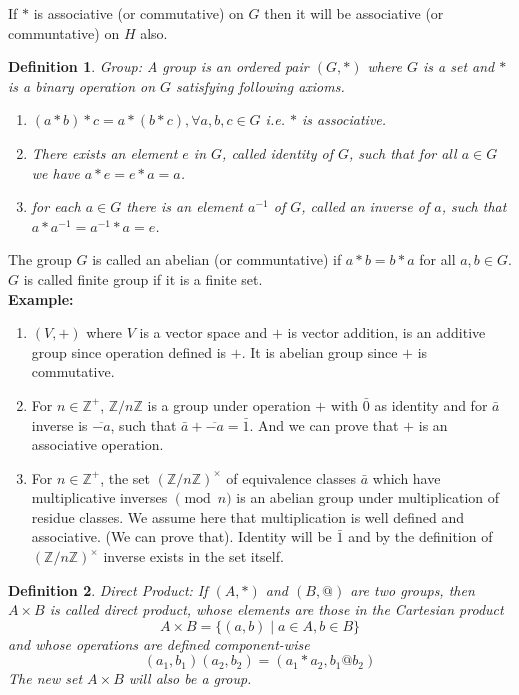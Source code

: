\documentclass[12pt]{report}
\newtheorem{defn}{Definition}
\begin{document}
If $*$ is associative (or commutative) on $G$ then it will be associative (or communtative) on $H$ also.
\begin{defn}
    Group: A group is an ordered pair $(G, *)$ where $G$ is a set and $*$ is a binary operation on $G$ satisfying following axioms.
    \begin{enumerate}
        \item $(a*b)*c = a*(b*c), \forall a,b,c \in G$ i.e. $*$ is associative.
        \item There exists an element $e$ in $G$, called identity of $G$, such that for all $a \in G$ we have $a*e = e*a = a$.
        \item for each $a \in G$ there is an element $a^{-1}$ of $G$, called an inverse of $a$, such that $a * a^{-1} = a^{-1} * a = e$.
    \end{enumerate}
\end{defn}
The group $G$ is called an abelian (or communtative) if $a*b = b*a$ for all $a,b \in G$.
$G$ is called finite group if it is a finite set.\\
\textbf{Example: }
\begin{enumerate}
    \item $(V, +)$ where $V$ is a vector space and $+$ is vector addition, is an additive group since operation defined is $+$. It is abelian group since $+$ is commutative.
    \item For $n \in \mathbb{Z}^+$, $\mathbb{Z}/n\mathbb{Z}$ is a group under operation $+$ with $\bar{0}$ as identity and for $\bar{a}$ inverse is $\overline{-a}$, such that $\bar{a} + \overline{-a} = \bar{1}$. And we can prove that $+$ is an associative operation.
    \item For $n \in \mathbb{Z}^+$, the set $(\mathbb{Z}/n\mathbb{Z})^{\times}$ of equivalence classes $\bar{a}$ which have multiplicative inverses $\pmod n$ is an abelian group under multiplication of residue classes. We assume here that multiplication is well defined and associative. (We can prove that). Identity will be $\bar{1}$ and by the definition of $(\mathbb{Z}/n\mathbb{Z})^{\times}$ inverse exists in the set itself.
\end{enumerate}
\begin{defn}
    Direct Product: If $(A, *)$ and $(B, @)$ are two groups, then $A \times B$ is called direct product, whose elements are those in the Cartesian product
    $$ A \times B = \{(a,b) \mid a \in A, b \in B\}$$
    and whose operations are defined component-wise
    $$ (a_1, b_1)(a_2, b_2) =(a_1 * a_2, b_1 @ b_2)$$ The new set $A \times B$ will also be a group. 
\end{defn}
\end{document}
